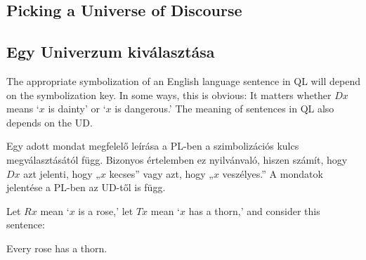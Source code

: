 \begin{table}[h!]
\end{table}

\begin{table}[h!]
\end{table}

\subsection*{Picking a Universe of Discourse}
\subsection{Egy Univerzum kiválasztása}
The appropriate symbolization of an English language sentence in QL will depend on the symbolization key. In some ways, this is obvious: It matters whether $Dx$ means `$x$ is dainty' or `$x$ is dangerous.' The meaning of sentences in QL also depends on the UD.

Egy adott mondat megfelelő leírása a PL-ben a szimbolizációs kulcs megválasztásától függ. Bizonyos értelemben ez nyilvánvaló, hiszen számít, hogy $Dx$ azt jelenti, hogy „$x$ kecses” vagy azt, hogy „$x$ veszélyes.” A mondatok jelentése a PL-ben az UD-től is függ.

Let $Rx$ mean `$x$ is a rose,' let $Tx$ mean `$x$ has a thorn,' and consider this sentence:
\begin{earg}
\item[\ex{pickUDrose}] Every rose has a thorn.
\end{earg}

